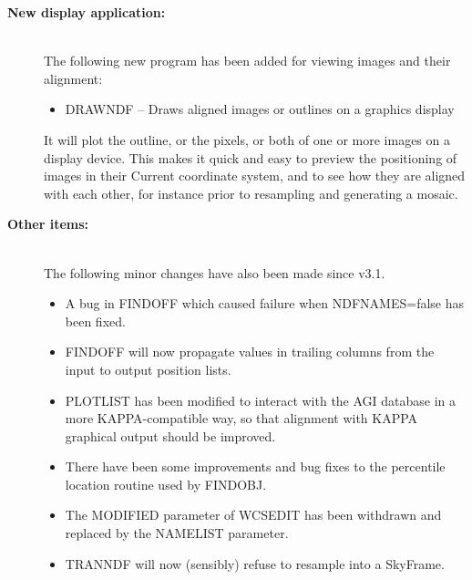 \documentclass[twoside,11pt]{article}
\newcommand{\htmlref}[2]{#1}
\newcommand{\xref}[3]{#1}
\renewcommand{\_}{\texttt{\symbol{95}}}
\newcommand{\xroutine}[1]{\htmlref{{\sc #1}}{#1}}
\begin{document}
\begin{description}
  \item[{\bf New display application:}]\mbox{}\\
     The following new program has been added for viewing images and
     their alignment:
     \begin{itemize}
     \item \xroutine{DRAWNDF} -- 
           Draws aligned images or outlines on a graphics display
     \end{itemize}
     It will plot the outline, or the pixels, or both of one or more
     images on a display device.  This makes it quick and easy to preview
     the positioning of images in their Current coordinate system,
     and to see how they are aligned with each other, for instance prior
     to resampling and generating a mosaic.

  \item[{\bf Other items:}]\mbox{}\\
     The following minor changes have also been made since v3.1.
     \begin{itemize}
      \item
        A bug in \xroutine{FINDOFF} which caused failure when NDFNAMES=false has
        been fixed.

      \item
        \xroutine{FINDOFF} will now 
        propagate values in trailing columns from the
        input to output position lists.

      \item
        \xroutine{PLOTLIST} has been modified to interact with the 
        \xref{AGI}{sun48}{} database
        in a more \xref{KAPPA}{sun95}{}-compatible way, so that 
        alignment with KAPPA
        graphical output should be improved.

      \item
        There have been some improvements and bug fixes to the percentile
        location routine used by \xroutine{FINDOBJ}.

      \item
        The MODIFIED parameter of \xroutine{WCSEDIT} 
        has been withdrawn and replaced
        by the NAMELIST parameter.

      \item
        \xroutine{TRANNDF} will now (sensibly) 
        refuse to resample into a SkyFrame.
     \end{itemize}

  \end{description}
\end{document}
